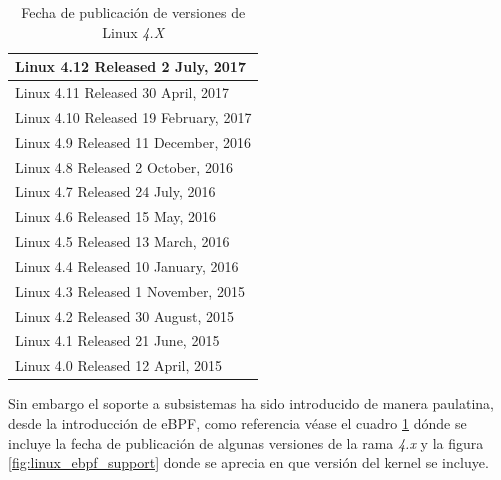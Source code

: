 \begin{table}[h]
\centering
\begin{tabular}[!h]{|l|}
\hline
Linux 4.12 Released 2 July, 2017 \\
\hline
Linux 4.11 Released 30 April, 2017 \\
\hline
Linux 4.10 Released 19 February, 2017 \\
\hline
Linux 4.9 Released 11 December, 2016 \\
\hline
Linux 4.8 Released 2 October, 2016 \\
\hline
Linux 4.7 Released 24 July, 2016 \\
\hline
Linux 4.6 Released 15 May, 2016 \\
\hline
Linux 4.5 Released 13 March, 2016 \\
\hline
Linux 4.4 Released 10 January, 2016 \\
\hline
Linux 4.3 Released 1 November, 2015 \\
\hline
Linux 4.2 Released 30 August, 2015 \\
\hline
Linux 4.1 Released 21 June, 2015 \\
\hline
Linux 4.0 Released 12 April, 2015 \\
\hline
\end{tabular}
\caption{\label{tab:linux-release-date}Fecha de publicación de versiones de Linux \emph{4.X}}
\end{table}

Sin embargo el soporte a subsistemas ha sido introducido de manera paulatina, desde la introducción de eBPF, como referencia véase el cuadro \ref{tab:linux-release-date} dónde se incluye la fecha de publicación de algunas versiones de la rama
\emph{4.x} y la figura \ref{fig:linux_ebpf_support} donde se aprecia en que versión del kernel se incluye.

\clearpage


